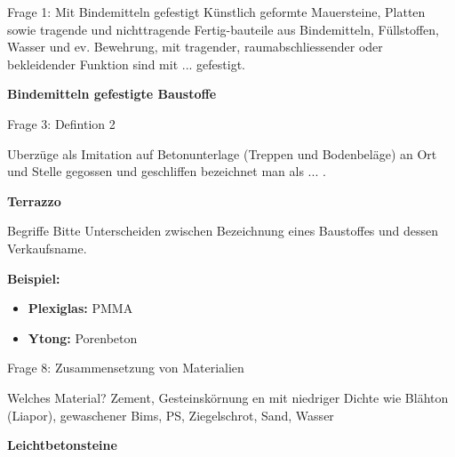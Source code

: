 \begin{frame}{Frage 1: Mit Bindemitteln gefestigt}
    Künstlich geformte Mauersteine, Platten sowie tragende und nichttragende Fertig-bauteile aus Bindemitteln,
Füllstoffen, Wasser und ev. Bewehrung, mit tragender, raumabschliessender oder bekleidender
Funktion sind mit ... gefestigt.

\pause
    \vspace{\baselineskip} 

    \textbf{Bindemitteln gefestigte Baustoffe}

    
\end{frame}

\begin{frame}{Frage 3: Defintion 2}

    Uberzüge als Imitation auf Betonunterlage (Treppen und Bodenbeläge) an Ort und Stelle gegossen und
geschliffen bezeichnet man als ... .

\pause
    \vspace{\baselineskip} 

    \textbf{Terrazzo}
\end{frame}

\begin{frame}
    \begin{block}{Begriffe}
        Bitte Unterscheiden zwischen Bezeichnung eines Baustoffes und dessen Verkaufsname.
    
        \vspace{\baselineskip}
    
        \textbf{Beispiel:}
        \begin{itemize}
            \item \textbf{Plexiglas:} PMMA
            \item \textbf{Ytong:} Porenbeton
        \end{itemize}
    \end{block}
\end{frame}

\begin{frame}{Frage 8: Zusammensetzung von Materialien}
    
    \begin{block}{Welches Material?}
        Zement,
Gesteinskörnung
en mit niedriger
Dichte wie
Blähton (Liapor),
gewaschener
Bims, PS,
Ziegelschrot,
Sand, Wasser
    \end{block}

\pause
    \vspace{\baselineskip} 

    \textbf{Leichtbetonsteine}

\end{frame}


